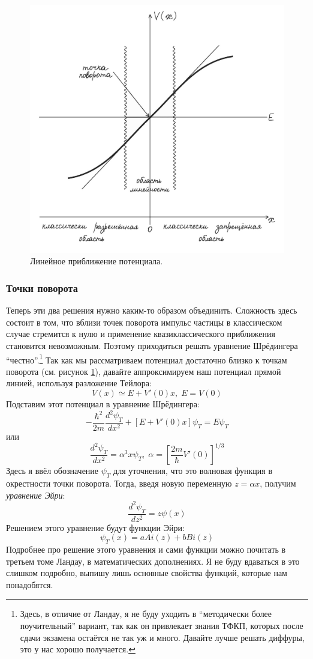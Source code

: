 \begin{figure}[ht]
\centering
\includegraphics[scale=0.28]{class_11/images/turning-point.jpg}
\caption{Линейное приближение потенциала.}
\label{fig 11.2}
\end{figure}

\subsubsection{Точки поворота}
\hspace{1em}Теперь эти два решения нужно каким-то образом объединить. Сложность здесь состоит в том, что вблизи точек поворота импульс частицы в классическом случае стремится к нулю и применение квазиклассического приближения становится невозможным. Поэтому приходиться решать уравнение Шрёдингера ``честно''.\footnote{Здесь, в отличие от Ландау, я не буду уходить в ``методически более поучительный'' вариант, так как он привлекает знания ТФКП, которых после сдачи экзамена остаётся не так уж и много. Давайте лучше решать диффуры, это у нас хорошо получается.} Так как мы рассматриваем потенциал достаточно близко к точкам поворота (см. рисунок \ref{fig 11.2}), давайте аппроксимируем наш потенциал прямой линией, используя разложение Тейлора:
\[
V(x) \simeq E + V'(0)x,\; E = V(0)
\]
Подставим этот потенциал в уравнение Шрёдингера:
\[
-\frac{\hbar^2}{2m}\frac{d^2 \psi_T}{dx^2} + [E + V'(0)x]\psi_T = E\psi_T
\]
или
\[
\frac{d^2 \psi_T}{dx^2} = \alpha^3 x \psi_T, \; \alpha = \left[ \frac{2m}{\hbar} V'(0) \right]^{1/3}
\]
Здесь я ввёл обозначение $\psi_T$ для уточнения, что это волновая функция в окрестности точки поворота. Тогда, введя новую переменную $z = \alpha x$, получим \textit{уравнение Эйри}:
\[
\frac{d^2 \psi_T}{dz^2} = z\psi(x)
\]
Решением этого уравнение будут функции Эйри:
\[
\psi_T(x) = aAi(z) + bBi(z)
\]
Подробнее про решение этого уравнения и сами функции можно почитать в третьем томе Ландау, в математических дополнениях. Я не буду вдаваться в это слишком подробно, выпишу лишь основные свойства функций, которые нам понадобятся.

